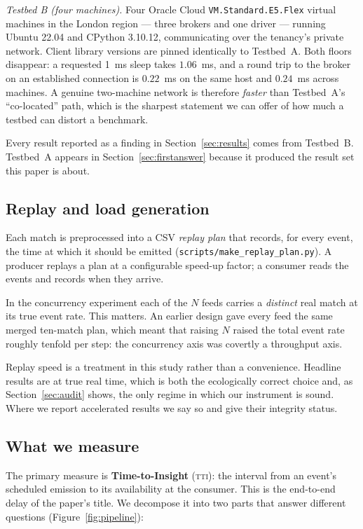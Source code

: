 \documentclass[Afour,sageh,times]{sagej}
\newcommand{\tti}{\textsc{tti}}
\begin{document}
\emph{Testbed B (four machines).} Four Oracle Cloud \texttt{VM.Standard.E5.Flex} virtual machines
in the London region --- three brokers and one driver --- running Ubuntu 22.04 and CPython
3.10.12, communicating over the tenancy's private network. Client library versions are pinned
identically to Testbed~A. Both floors disappear: a requested 1~ms sleep takes $1.06$~ms, and a
round trip to the broker on an established connection is $0.22$~ms on the same host and
$0.24$~ms across machines. A genuine two-machine network is therefore \emph{faster} than
Testbed~A's ``co-located'' path, which is the sharpest statement we can offer of how much a
testbed can distort a benchmark.

Every result reported as a finding in Section~\ref{sec:results} comes from Testbed~B. Testbed~A
appears in Section~\ref{sec:firstanswer} because it produced the result set this paper is about.

\subsection{Replay and load generation}
\label{sec:replay}

Each match is preprocessed into a CSV \emph{replay plan} that records, for every event, the time
at which it should be emitted (\texttt{scripts/make\_replay\_plan.py}). A producer replays a plan
at a configurable speed-up factor; a consumer reads the events and records when they arrive.

In the concurrency experiment each of the $N$ feeds carries a \emph{distinct} real match at its
true event rate. This matters. An earlier design gave every feed the same merged ten-match plan,
which meant that raising $N$ raised the total event rate roughly tenfold per step: the
concurrency axis was covertly a throughput axis.

Replay speed is a treatment in this study rather than a convenience. Headline results are at true
real time, which is both the ecologically correct choice and, as Section~\ref{sec:audit} shows,
the only regime in which our instrument is sound. Where we report accelerated results we say so
and give their integrity status.

\subsection{What we measure}
\label{sec:metrics}

The primary measure is \textbf{Time-to-Insight} (\tti{}): the interval from an event's scheduled
emission to its availability at the consumer. This is the end-to-end delay of the paper's title.
We decompose it into two parts that answer different questions
(Figure~\ref{fig:pipeline}):
\end{document}
